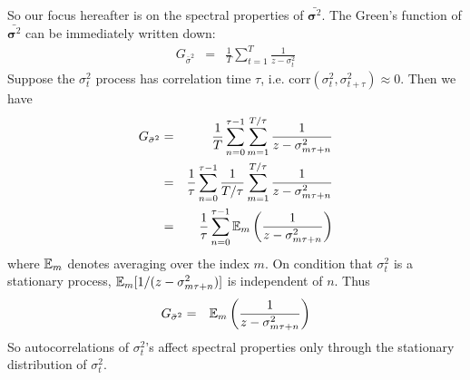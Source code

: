 \documentclass{article}
\begin{document}
So our focus hereafter is on the spectral properties of $\bar{
\bm \sigma^2}$. The Green's function of $\bar{\bm \sigma^2}$
can be immediately written down:
\begin{eqnarray*}
G_{\bar \sigma^2} &=& \frac{1}{T}\sum_{t=1}^T \frac{1}{z - \sigma_t^2}
\end{eqnarray*}
Suppose the $\sigma_t^2$ process has correlation time $\tau$,
i.e. $\text{corr}(\sigma_t^2, \sigma^2_{t+\tau}) \approx 0$. Then we
have
\begin{eqnarray*}
G_{\bar \sigma^2} &=& {1 \over T}\sum_{n=0}^{\tau-1}\sum_{m=1}^{T/\tau}
\frac{1}{z - \sigma_{m\tau + n}^2} \\
&=& {1 \over \tau}\sum_{n=0}^{\tau-1} {1 \over T/\tau}
\sum_{m=1}^{T/\tau} \frac{1}{z - \sigma_{m\tau + n}^2} \\
&=& {1 \over \tau}\sum_{n=0}^{\tau-1}
\mathbb{E}_m\left(\frac{1}{z - \sigma_{m\tau + n}^2}\right)
\end{eqnarray*}
where $\mathbb{E}_m$ denotes averaging over the index $m$. On condition that
$\sigma_t^2$ is a stationary process, $\mathbb{E}_m[1 / (z -
    \sigma_{m\tau + n}^2)]$ is independent of $n$. Thus
\begin{eqnarray}\label{eq:greens}
G_{\bar \sigma^2} &=& \mathbb{E}_m\left(
  \frac{1}{z - \sigma_{m\tau + n}^2}
\right)
\end{eqnarray}
So autocorrelations of $\sigma_t^2$'s affect spectral properties
only through the stationary distribution of $\sigma_t^2$.
\end{document}
